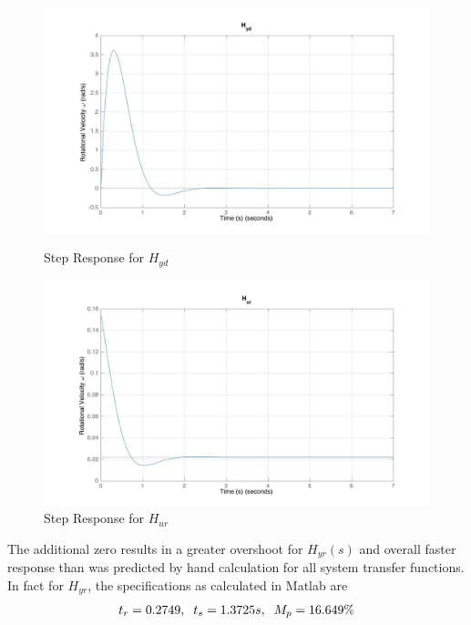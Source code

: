 \documentclass[11pt,titlepage]{article}
\begin{document}
    \begin{figure}[H]
        \centering
        \begin{minipage}{.5\textwidth}
            \centering
            \includegraphics[scale=.18]{Hyd_step1_mat}
            \caption{Step Response for $H_{yd}$}
            \label{fig:Hyd_step1_mat}
        \end{minipage}%
        \begin{minipage}{.5\textwidth}
            \centering
            \includegraphics[scale=.18]{Hur_step1_mat}
            \caption{Step Response for $H_{ur}$}
            \label{fig:Hur_step1_mat}
        \end{minipage}%
    \end{figure}

	
	\noindent The additional zero results in a greater overshoot for $H_{yr}(s)$ and overall faster response than was predicted by hand calculation for all system transfer functions. In fact for $H_{yr}$, the specifications as calculated in Matlab are 
	\begin{align*}
		t_r = 0.2749,\hspace{0.2cm} t_s=1.3725 s, \hspace{0.2cm} M_p=16.649\%
	\end{align*}
	
\end{document}
